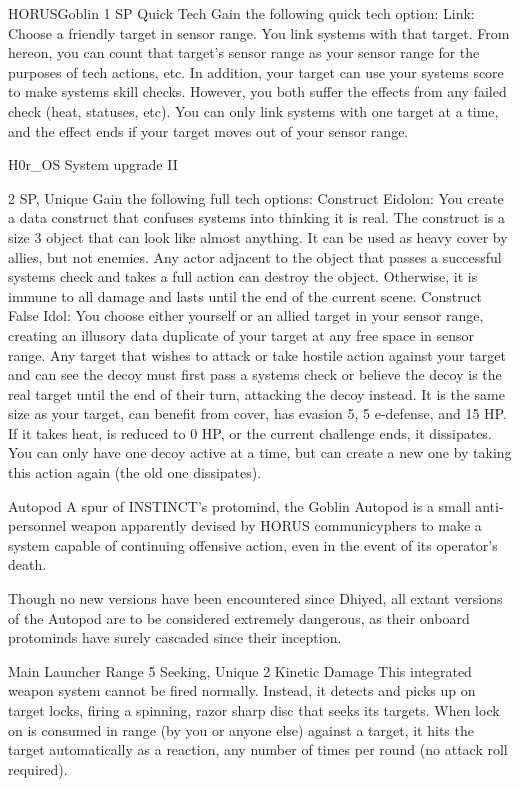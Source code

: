 \begin{mech}{HORUS}{Goblin}
1 SP
Quick Tech
Gain the following quick tech option:
Link: Choose a friendly target in sensor range. You link systems with that target. From hereon, you can count that target’s sensor range as your sensor range for the purposes of tech actions, etc. In addition, your target can use your systems score to make systems skill checks. However, you both suffer the effects from any failed check (heat, statuses, etc). You can only link systems with one target at a time, and the effect ends if your target moves out of your sensor range.

H0r\_OS System upgrade II

2 SP, Unique
Gain the following full tech options:
Construct Eidolon: You create a data construct that confuses systems into thinking it is real. The construct is a size 3 object that can look like almost anything. It can be used as heavy cover by allies, but not enemies. Any actor adjacent to the object that passes a successful systems check and takes a full action can destroy the object. Otherwise, it is immune to all damage and lasts until the end of the current scene.
Construct False Idol: You choose either yourself or an allied target in your sensor range, creating an illusory data duplicate of your target at any free space in sensor range. Any target that wishes to attack or take hostile action against your target and can see the decoy must first pass a systems check or believe the decoy is the real target until the end of their turn, attacking the decoy instead. It is the same size as your target, can benefit from cover, has evasion 5, 5 e-defense, and 15 HP. If it takes heat, is reduced to 0 HP, or the current challenge ends, it dissipates. You can only have one decoy active at a time, but can create a new one by taking this action again (the old one dissipates).

Autopod
A spur of INSTINCT’s protomind, the Goblin Autopod is a small anti-personnel weapon apparently devised by HORUS communicyphers to make a system capable of continuing offensive action, even in the event of its operator’s death.

Though no new versions have been encountered since Dhiyed, all extant versions of the Autopod are to be considered extremely dangerous, as their onboard protominds have surely cascaded since their inception.

Main Launcher
Range 5
Seeking, Unique
2 Kinetic Damage
This integrated weapon system cannot be fired normally. Instead, it detects and picks up on target locks, firing a spinning, razor sharp disc that seeks its targets. When lock on is consumed in range (by you or anyone else) against a target, it hits the target automatically as a reaction, any number of times per round (no attack roll required).


\end{mech}
